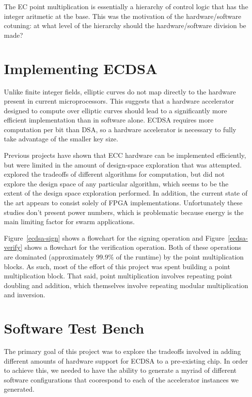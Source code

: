 \documentclass[twocolumn]{article}
\begin{document}
The EC point multiplication is essentially a hierarchy of control
logic that has the integer aritmetic at the base. This was the
motivation of the hardware/software cotuning: at what level of the
hierarchy should the hardware/software division be made?

\section{Implementing ECDSA}

Unlike finite integer fields, elliptic curves do not map directly to
the hardware present in current microprocessors\cite{kss-ecdsa}. This
suggests that a hardware accelerator designed to compute over elliptic
curves should lead to a significantly more efficient implementation
than in software alone.  ECDSA requires more computation per bit than
DSA, so a hardware accelerator is necessary to fully take advantage of
the smaller key size.

Previous projects\cite{nnll-ecdsa_hw} have shown that ECC hardware can
be implemented efficiently, but were limited in the amount of
design-space exploration that was attempted.  \cite{mmm-hw_ecc}
explored the tradeoffs of different algorithms for computation, but
did not explore the design space of any particular algorithm, which
seems to be the extent of the design space exploration performed.  In
addition, the current state of the art appears to consist solely of
FPGA implementations.  Unfortunately these studies don't present power
numbers, which is problematic because energy is the main limiting
factor for swarm applications.

Figure~\ref{ecdsa-sign} shows a flowchart for the signing operation
and Figure~\ref{ecdsa-verify} shows a flowchart for the verification
operation.  Both of these operations are dominated (approximately
$99.9\%$ of the runtime) by the point multiplication blocks.  As such,
most of the effort of this project was spent building a point
multiplication block.  That said, point multiplication involves
repeating point doubling and addition, which themselves involve
repeating modular multiplication and inversion.

\section{Software Test Bench}

The primary goal of this project was to explore the tradeoffs involved
in adding different amounts of hardware support for ECDSA to a
pre-existing chip.  In order to achieve this, we needed to have the
ability to generate a myriad of different software configurations that
coorespond to each of the accelerator instances we generated.
\end{document}

